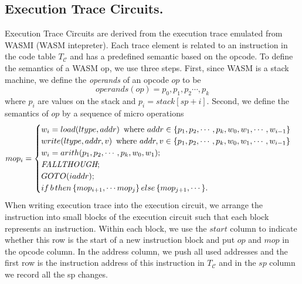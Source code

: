 \subsection{Execution Trace Circuits.}
\label{chp:ex-table}
Execution Trace Circuits are derived from the execution trace emulated from WASMI (WASM intepreter). Each trace element is related to an instruction in the code table $T_\mathcal{C}$ and has a predefined semantic based on the opcode. To define the semantics of a WASM op, we use three steps. First, since WASM is a stack machine, we define the \emph{operands} of an opcode $op$ to be
\[
operands(op) = p_0, p_1, p_2 \cdots, p_k
\]
where $p_i$ are values on the stack and $p_i = stack[sp+i]$.
Second, we define the semantics of $op$ by a sequence of micro operations
\[
mop_i = \begin{cases}
    w_i = load(ltype, addr)\, \textnormal{ where $addr \in \{p_1, p_2, \cdots, p_k, w_0, w_1, \cdots, w_{i-1}\}$}\\
    write(ltype, addr, v)\, \textnormal{ where $addr, v \in \{p_1, p_2, \cdots, p_k, w_0, w_1, \cdots, w_{i-1}\}$}\\
    w_i = arith(p_1, p_2,\cdots, p_k, w_0, w_1); \\
    \textit{FALLTHOUGH}; \\
    GOTO(iaddr); \\
    if \, b\, then\, \{mop_{i+1}, \cdots mop_{j}\} \,else\, \{mop_{j+1},\cdots\}.
    \end{cases}
\]
When writing execution trace into the execution circuit, we arrange the instruction into small blocks of the execution circuit such that each block represents an instruction. Within each block, we use the $start$ column to indicate whether this row is the start of a new instruction block and put $op$ and $mop$ in the opcode column. In the address column, we push all used addresses and the first row is the instruction address of this instruction in $T_\mathcal{C}$ and in the $sp$ column we record all the sp changes.
